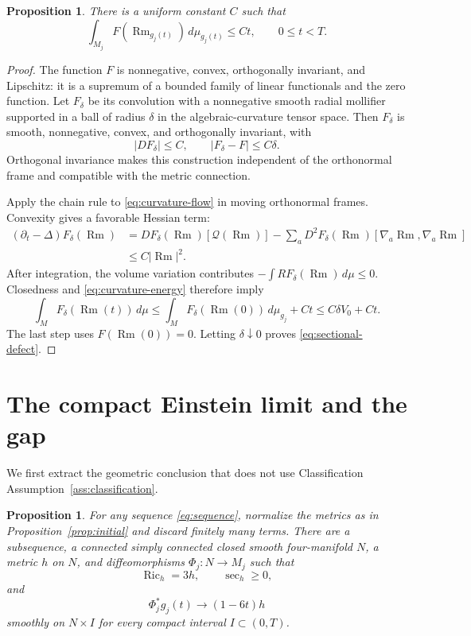 \documentclass[11pt]{article}
\newtheorem{proposition}[theorem]{Proposition}
\theoremstyle{definition}
\theoremstyle{remark}
\numberwithin{equation}{section}
\DeclareMathOperator{\Ric}{Ric}
\DeclareMathOperator{\Rm}{Rm}
\newcommand{\dd}{\,d\mu}
\begin{document}
\begin{proposition}\label{prop:sectional-defect}
There is a uniform constant $C$ such that
\begin{equation}\label{eq:sectional-defect}
 \int_{M_j}F(\Rm_{g_j(t)})\,d\mu_{g_j(t)}\le Ct,
 \qquad 0\le t<T.
\end{equation}
\end{proposition}

\begin{proof}
The function $F$ is nonnegative, convex, orthogonally invariant, and
Lipschitz: it is a supremum of a bounded family of linear functionals
and the zero function. Let $F_\delta$ be its convolution with a
nonnegative smooth radial mollifier supported in a ball of radius
$\delta$ in the algebraic-curvature tensor space. Then $F_\delta$ is
smooth, nonnegative, convex, and orthogonally invariant, with
\[
 |DF_\delta|\le C,\qquad |F_\delta-F|\le C\delta.
\]
Orthogonal invariance makes this construction independent of the
orthonormal frame and compatible with the metric connection.

Apply the chain rule to \eqref{eq:curvature-flow} in moving
orthonormal frames. Convexity gives a favorable Hessian term:
\begin{align*}
 (\partial_t-\Delta)F_\delta(\Rm)
 &=DF_\delta(\Rm)[\mathcal Q(\Rm)]
   -\sum_aD^2F_\delta(\Rm)
           [\nabla_a\Rm,\nabla_a\Rm]\\
 &\le C|\Rm|^2.
\end{align*}
After integration, the volume variation contributes
$-\int R F_\delta(\Rm)\dd\le0$. Closedness and
\eqref{eq:curvature-energy} therefore imply
\[
 \int_MF_\delta(\Rm(t))\dd
 \le\int_MF_\delta(\Rm(0))\,d\mu_{g_j}+Ct
 \le C\delta V_0+Ct.
\]
The last step uses $F(\Rm(0))=0$. Letting $\delta\downarrow0$ proves
\eqref{eq:sectional-defect}.
\end{proof}

\section{The compact Einstein limit and the gap}
\label{sec:limit}

We first extract the geometric conclusion that does not use
Classification Assumption~\ref{ass:classification}.

\begin{proposition}\label{prop:limit}
For any sequence \eqref{eq:sequence}, normalize the metrics as in
Proposition~\ref{prop:initial} and discard finitely many terms.
There are a subsequence, a connected simply connected closed smooth
four-manifold $N$, a metric $h$ on $N$, and diffeomorphisms
$\Phi_j:N\to M_j$ such that
\[
 \Ric_h=3h,\qquad \sec_h\ge0,
\]
and
\begin{equation}\label{eq:flow-limit}
 \Phi_j^*g_j(t)\longrightarrow (1-6t)h
\end{equation}
smoothly on $N\times I$ for every compact interval $I\subset(0,T)$.
\end{proposition}
\end{document}
